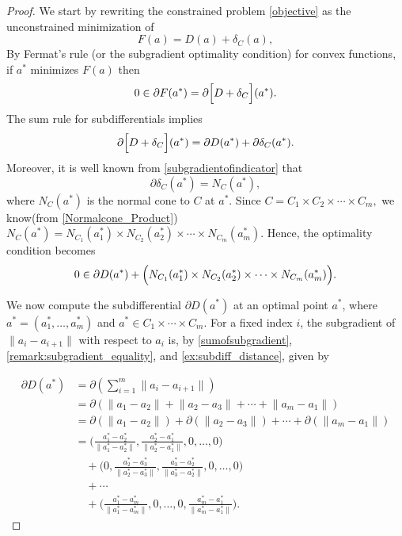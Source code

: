 \documentclass[12pt]{article}
\theoremstyle{plain}
\theoremstyle{definition}
\begin{document}
\begin{proof}
	
	We start by rewriting the constrained problem \eqref{objective} as the unconstrained minimization of 
	\begin{equation}
		F(a)=D(a)+\delta_C(a),
	\end{equation}
	By Fermat's rule (or the subgradient optimality condition) for convex functions, if $a^*$ minimizes $F(a)$ then
	\[
	0\in\partial F(a^*)=\partial\Bigl[D+\delta_C\Bigr](a^*).
	\]
	The sum rule for subdifferentials implies
	\[
	\partial\Bigl[D+\delta_C\Bigr](a^*)=\partial D(a^*)+\partial \delta_C(a^*).
	\]
	Moreover, it is well known from \eqref{subgradientofindicator} that 
	\[
	\partial\delta_C(a^*)=N_C(a^*),
	\]
	where $N_C(a^*)$ is the normal cone to $C$ at $a^*$. Since $
	C=C_1\times C_2\times\cdots\times C_m,$ we know(from \ref{Normalcone_Product}) $N_C(a^*)=N_{C_1}(a_1^*)\times N_{C_2}(a_2^*)\times\cdots\times N_{C_m}(a_m^*).$
	Hence, the optimality condition becomes
	\begin{equation}
		0\in \partial D(a^*)+ \Bigl( N_{C_1}(a_1^*)\times N_{C_2}(a_2^*)\times\cdots\times N_{C_m}(a_m^*) \Bigr).
		\label{eq:opt_cond1}
	\end{equation}
	
	We now compute the subdifferential \(\partial D(a^*)\) at an optimal point \(a^*\), where \(a^* = (a_1^*, \dots, a_m^*)\) and \(a^* \in C_1 \times \cdots \times C_m\). For a fixed index \(i\), the subgradient of \(\|a_i - a_{i+1}\|\) with respect to \(a_i\) is, by \ref{sumofsubgradient}, \ref{remark:subgradient_equality}, and \ref{ex:subdiff_distance}, given by
	
	
	\begin{align}
		\partial D(a^*) 
		&= \partial\left( \sum_{i=1}^{m} \lVert a_i - a_{i+1} \rVert \right) \nonumber\\
		&= \partial\left(
		\lVert a_1 - a_2 \rVert
		+ \lVert a_2 - a_3 \rVert
		+ \cdots
		+ \lVert a_m - a_1 \rVert
		\right) \nonumber\\
		&= \partial\left( \lVert a_1 - a_2 \rVert \right)
		+ \partial\left( \lVert a_2 - a_3 \rVert \right)
		+ \cdots
		+ \partial\left( \lVert a_m - a_1 \rVert \right) \nonumber\\
		&= \Biggl(
		\tfrac{a_1^* - a_2^*}{\lVert a_1^* - a_2^* \rVert},
		\tfrac{a_2^* - a_1^*}{\lVert a_2^* - a_1^* \rVert},
		0, \dots, 0
		\Biggr) \nonumber\\
		&\quad + \Biggl(
		0,
		\tfrac{a_2^* - a_3^*}{\lVert a_2^* - a_3^* \rVert},
		\tfrac{a_3^* - a_2^*}{\lVert a_3^* - a_2^* \rVert},
		0, \dots, 0
		\Biggr) \nonumber\\
		&\quad + \cdots \nonumber\\
		&\quad + \Biggl(
		\tfrac{a_1^* - a_m^*}{\lVert a_1^* - a_m^* \rVert},
		0, \dots, 0,
		\tfrac{a_m^* - a_1^*}{\lVert a_m^* - a_1^* \rVert}
		\Biggr).
		\label{eq:partial_subgradient_long}
	\end{align}
	

\end{proof}
\end{document}
